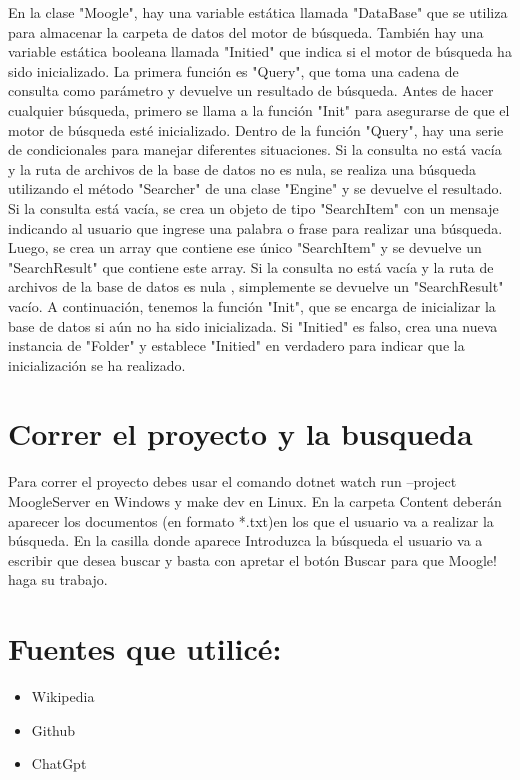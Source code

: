 \documentclass[a4paper,12pt]{article}
\begin{document}
En la clase "Moogle", hay una variable estática llamada "DataBase" que se utiliza para almacenar la carpeta de datos del motor de búsqueda. También hay una variable estática booleana llamada "Initied" que indica si el motor de búsqueda ha sido inicializado.
La primera función es "Query", que toma una cadena de consulta como parámetro y devuelve un resultado de búsqueda. Antes de hacer cualquier búsqueda, primero se llama a la función "Init" para asegurarse de que el motor de búsqueda esté inicializado.
Dentro de la función "Query", hay una serie de condicionales para manejar diferentes situaciones. Si la consulta no está vacía y la ruta de archivos de la base de datos no es nula, se realiza una búsqueda utilizando el método "Searcher" de una clase "Engine" y se devuelve el resultado.
Si la consulta está vacía, se crea un objeto de tipo "SearchItem" con un mensaje indicando al usuario que ingrese una palabra o frase para realizar una búsqueda. Luego, se crea un array que contiene ese único "SearchItem" y se devuelve un "SearchResult" que contiene este array.
Si la consulta no está vacía y la ruta de archivos de la base de datos es nula , simplemente se devuelve un "SearchResult" vacío.
A continuación, tenemos la función "Init", que se encarga de inicializar la base de datos si aún no ha sido inicializada. Si "Initied" es falso, crea una nueva instancia de "Folder" y establece "Initied" en verdadero para indicar que la inicialización se ha realizado.

\section{Correr el proyecto y la busqueda }
Para correr el proyecto debes usar el comando dotnet watch run --project MoogleServer en Windows y make dev en Linux. En la carpeta Content deberán aparecer los documentos
(en formato *.txt)en los que el usuario va a realizar la búsqueda. En la casilla donde aparece Introduzca la búsqueda el usuario va a escribir que desea buscar y basta con apretar el botón Buscar para que Moogle! haga su trabajo.

\newpage
\section{Fuentes que utilicé:}
\begin{itemize}
	\item Wikipedia
	\item Github
    \item ChatGpt

\end{itemize}
\end{document}
